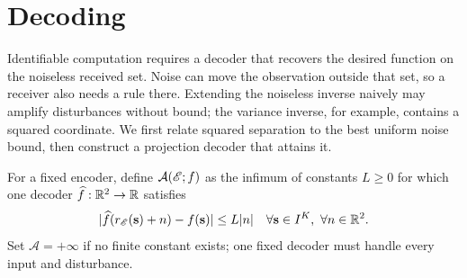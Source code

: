 \section{Decoding}\label{sec:decoding}
Identifiable computation requires a decoder that recovers the desired function on the noiseless received set. Noise can move the observation outside that set, so a receiver also needs a rule there. Extending the noiseless inverse naively may amplify disturbances without bound; the variance inverse, for example, contains a squared coordinate. We first relate squared separation to the best uniform noise bound, then construct a projection decoder that attains it.

For a fixed encoder, define $\mathcal A(\mathscr E;f)$ as the infimum of constants $L\ge0$ for which one decoder $\widehat f:\mathbb R^2\to\mathbb R$ satisfies
\begin{equation}
 |\widehat f(r_\mathscr E(\mathbf s)+n)-f(\mathbf s)|\le L|n|
 \quad\forall\mathbf s\in I^K,\ \forall n\in\mathbb R^2.
 \label{eq:uniform}
\end{equation}
Set $\mathcal A=+\infty$ if no finite constant exists; one fixed decoder must handle every input and disturbance.

